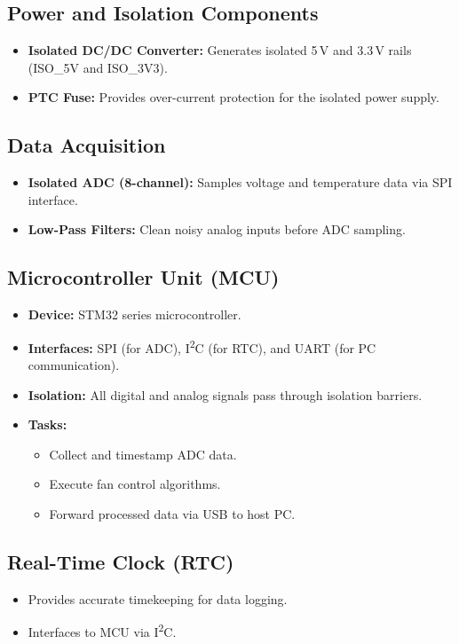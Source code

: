 \documentclass[12pt,a4paper]{article}
\begin{document}
\subsection{Power and Isolation Components}
\begin{itemize}
    \item \textbf{Isolated DC/DC Converter:} Generates isolated 5\,V and 3.3\,V rails (ISO\_5V and ISO\_3V3).
    \item \textbf{PTC Fuse:} Provides over-current protection for the isolated power supply.
\end{itemize}

\subsection{Data Acquisition}
\begin{itemize}
    \item \textbf{Isolated ADC (8-channel):} Samples voltage and temperature data via SPI interface.
    \item \textbf{Low-Pass Filters:} Clean noisy analog inputs before ADC sampling.
\end{itemize}

\subsection{Microcontroller Unit (MCU)}
\begin{itemize}
    \item \textbf{Device:} STM32 series microcontroller.
    \item \textbf{Interfaces:} SPI (for ADC), I\textsuperscript{2}C (for RTC), and UART (for PC communication).
    \item \textbf{Isolation:} All digital and analog signals pass through isolation barriers.
    \item \textbf{Tasks:}
        \begin{itemize}
            \item Collect and timestamp ADC data.
            \item Execute fan control algorithms.
            \item Forward processed data via USB to host PC.
        \end{itemize}
\end{itemize}

\subsection{Real-Time Clock (RTC)}
\begin{itemize}
    \item Provides accurate timekeeping for data logging.
    \item Interfaces to MCU via I\textsuperscript{2}C.
\end{itemize}
\end{document}
